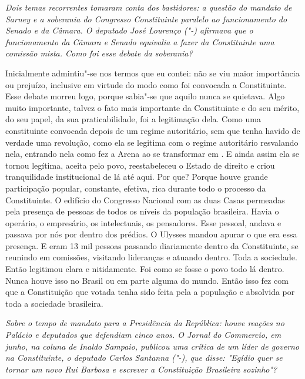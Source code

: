 \medskip

\noindent\emph{Dois temas recorrentes tomaram conta dos bastidores: a questão
do mandato de Sarney e a soberania do Congresso Constituinte paralelo ao
funcionamento do Senado e da Câmara. O deputado José Lourenço ("-)
afirmava que o funcionamento da Câmara e Senado equivalia a fazer da
Constituinte uma comissão mista. Como foi esse debate da soberania?}

Inicialmente admintiu"-se nos termos que eu contei: não
se viu maior importância ou prejuízo, inclusive em virtude do modo como
foi convocada a Constituinte. Esse debate morreu logo, porque sabia"-se
que aquilo nunca se quietava. Algo muito importante, talvez o fato mais
importante da Constituinte e do seu mérito, do seu papel, da sua
praticabilidade, foi a legitimação dela. Como uma constituinte convocada
depois de um regime autoritário, sem que tenha havido de verdade uma
revolução, como ela se legitima com o regime autoritário resvalando
nela, entrando nela como fez a Arena ao se transformar em . E ainda
assim ela se tornou legítima, aceita pelo povo, reestabeleceu o Estado
de direito e criou tranquilidade institucional de lá até aqui. Por que?
Porque houve grande participação popular, constante, efetiva, rica
durante todo o processo da Constituinte. O edifício do Congresso
Nacional com as duas Casas permeadas pela presença de pessoas de todos
os níveis da população brasileira. Havia o operário, o empresário, os
intelectuais, os pensadores. Esse pessoal, andava e passava por nós por
dentro dos prédios. O Ulysses mandou apurar o que era essa presença. E
eram 13 mil pessoas passando diariamente dentro da Constituinte, se
reunindo em comissões, visitando lideranças e atuando dentro. Toda a
sociedade. Então legitimou clara e nitidamente. Foi como se fosse o povo
todo lá dentro. Nunca houve isso no Brasil ou em parte alguma do mundo.
Então isso fez com que a Constituição que votada tenha sido feita pela a
população e absolvida por toda a sociedade brasileira.

\medskip

\noindent\emph{Sobre o tempo de mandato para a Presidência da República: houve
reações no Palácio e deputados que defendiam cinco anos. O Jornal do
Commercio, em junho, na coluna de Inaldo Sampaio, publicou uma crítica
de um líder de governo na Constituinte, o deputado Carlos Santanna
("-), que disse: "Egídio quer se tornar um novo Rui Barbosa e
escrever a Constituição Brasileira sozinho"?}

